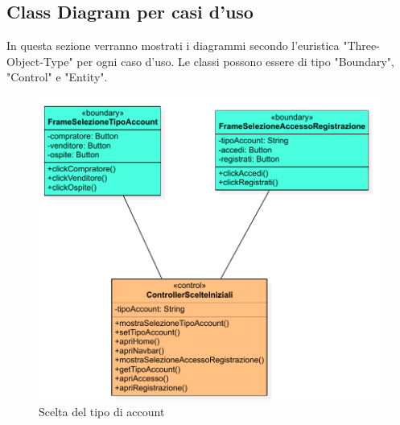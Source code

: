         \subsection{Class Diagram per casi d'uso}
            In questa sezione verranno mostrati i diagrammi secondo l'euristica "Three-Object-Type" per ogni caso d'uso. Le classi possono essere di tipo "Boundary", "Control" e "Entity".
        
            \begin{figure}[htbp!]
                \centering
                    \includegraphics[width=1\linewidth]{Immagini/Diagrammi/Class Diagram/Analisi/Utente che non ha effettuato l'accesso/ScelteIniziali.pdf}
                \caption{Scelta del tipo di account}
            \end{figure}
            
